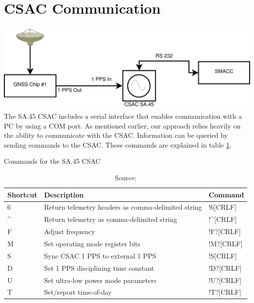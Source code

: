 \documentclass[12pt,english,a4paper]{report}
\begin{document}
\section{CSAC Communication}
  \includegraphics[width=1\textwidth]{csac_serial.pdf}
The SA.45 CSAC includes a serial interface that enables communication with a PC by using a COM port. As mentioned earlier, our approach relies heavily on the ability to communicate with the CSAC.
Information can be queried by sending commands to the CSAC. These commands are explained in table \ref{CSAC_COMMANDS}. 
\begin{table}[]
\centering
\caption{Commands for the SA.45 CSAC}
\label{CSAC_COMMANDS}
\begin{tabular}{|l|l|l|}
\hline
Shortcut          & Description                                        & Command                       \\ \hline
6                 & Return telemetry headers as comma-delimited string & !6{[}CRLF{]}                  \\ \hline
\textasciicircum  & Return telemetry as comma-delimited string         & !\textasciicircum  {[}CRLF{]} \\ \hline
F                 & Adjust frequency                                   & !F?{[}CRLF{]}                 \\ \hline
M                 & Set operating mode register bits                   & !M?{[}CRLF{]}                 \\ \hline
S                 & Sync CSAC 1 PPS to external 1 PPS                  & !S{[}CRLF{]}                  \\ \hline
D                 & Set 1 PPS disciplining time constant               & !D?{[}CRLF{]}                 \\ \hline
U                 & Set ultra-low power mode parameters                & !U?{[}CRLF{]}                 \\ \hline
T                 & Set/report time-of-day                             & !T?{[}CRLF{]}                 \\ \hline
\end{tabular}
\caption*{Source: \cite{CSAC_USERGUIDE}}
\end{table}
\end{document}
